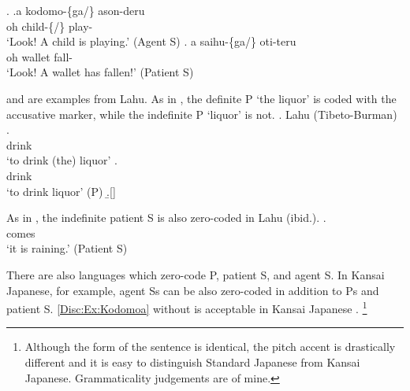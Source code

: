 \ex.\label{Disc:Ex:Kodomo}
	\ag.\label{Disc:Ex:Kodomoa}a kodomo-\{ga/\} ason-deru \\
		oh child-\{/\EM{\O}\} play- \\
		`Look! A child is playing.' \hfill{(Agent S)}
		\bg. a saihu-\{ga/\EM{\O}\} oti-teru \\
			oh wallet fall- \\
			`Look! A wallet has fallen!' \hfill{(Patient S)}

\Next and \NNext are examples from Lahu.
As in \Next[a],
the definite P `the liquor' is coded with the accusative marker,
while the indefinite P `liquor' is not.
\ex. Lahu (Tibeto-Burman)
 \ag.  {}  \\
	  drink \\
	`to drink (the) liquor'
 \bg.   \\
	 drink \\
	`to drink liquor' \hfill{(P)}
 \b.[] \hfill{\cite[p.\ 307]{matisoff81}}

As in \Next,
the indefinite patient S is also zero-coded in Lahu (ibid.).
	\exg. \footnotemark{}  \\
			 comes \\
			`it is raining.' \hfill{(Patient S)}

%
There are also languages which zero-code P, patient S, and agent S.
In Kansai Japanese, for example,
agent Ss can be also zero-coded in addition to Ps and patient S.
\ref{Disc:Ex:Kodomoa} without  is acceptable in Kansai Japanese \cite[see also][]{nakagawa13m}.%
	\footnote{
	Although the form of the sentence is identical,
	the pitch accent is drastically different and it is easy to distinguish Standard Japanese from Kansai Japanese.
	Grammaticality judgements are of mine.
	}



